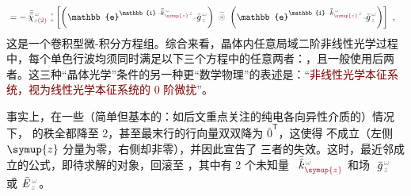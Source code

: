 \begin{subequations}
\begin{align}
	&= - \Xint{{}^{}_{\mathcolor{gray}{-}}}{23}{\bar{\bar{\bar{\chi}}}}^{\;\! \mathcolor{gray}{\omega}}_{\mathcolor{gray}{z} \textcolor{Maroon}{(2)}} ~{}^{\mathcolor{gray}{*}}_{\mathcolor{gray}{*}} \left[ \left( \mathbb{e}^{\mathbb{i} \Xint{\begin{smallmatrix} ~ \\ {}^{}_{\mathcolor{gray}{-}} \\ ~ \end{smallmatrix}}{15}{\bar{\bar{k}}}_{\textcolor{Maroon}{\symup{z}}}^{\;\! \mathcolor{gray}{\omega}} \mathcolor{gray}{z}} \Xint{{}^{}_{\mathcolor{gray}{-}}}{10}{\bar{g}}^{\;\!\mathcolor{gray}{\omega}}_{\;\! \mathcolor{gray}{z}} \right) ~\mathcolor{gray}{\widetilde \circledast}~ \left( \mathbb{e}^{\mathbb{i} \Xint{\begin{smallmatrix} ~ \\ {}^{}_{\mathcolor{gray}{-}} \\ ~ \end{smallmatrix}}{15}{\bar{\bar{k}}}_{\textcolor{Maroon}{\symup{z}}}^{\;\! \mathcolor{gray}{\omega}} \mathcolor{gray}{z}} \Xint{{}^{}_{\mathcolor{gray}{-}}}{10}{\bar{g}}^{\;\!\mathcolor{gray}{\omega}}_{\;\! \mathcolor{gray}{z}} \right) \right] \label{eq:nonlinear(2)-wave_wkrho-simplify6-V3} ~,
\end{align}
\end{subequations}
这是一个卷积型微-积分方程组。综合来看，晶体内任意局域二阶非线性光学过程中，每个单色行波均须同时满足以下三个方程中的任意两者：，且一般使用后两者。这三种“晶体光学”条件的另一种更“数学物理”的表述是：“\textcolor{Maroon}{非线性光学本征系统，视为线性光学本征系统的 0 阶微扰}”。

事实上，在一些（简单但基本的：如后文重点关注的纯电各向异性介质的）情况下， 的秩全都降至 2，甚至最末行的行向量双双降为 $\bar{0}^\mathsf{T}$，这使得  不成立（左侧 $\symup{z}$ 分量为零，右侧却非零），并因此宣告了  三者的失效。这时，最近邻成立的公式，即待求解的对象，回滚至 ，其中有 2 个未知量 $\Xint{\begin{smallmatrix} ~ \\ {}^{}_{\mathcolor{gray}{-}} \\ ~ \end{smallmatrix}}{15}{\bar{\bar{k}}}_{\textcolor{Maroon}{\symup{z}}}^{\;\! \mathcolor{gray}{\omega}}$ 和场 $\Xint{{}^{}_{\mathcolor{gray}{-}}}{10}{\bar{g}}^{\;\!\mathcolor{gray}{\omega}}_{\;\! \mathcolor{gray}{z}}$ 或 $\Xint{\mathcolor{gray}{-}}{295}{\bar{E}}^{\;\!\mathcolor{gray}{\omega}}_{\;\! \mathcolor{gray}{z}}$。


